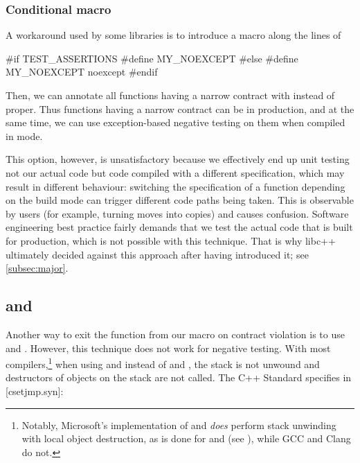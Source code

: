 \subsubsection{Conditional  macro}
\label{subsubsec:conditional}

A workaround used by some libraries is to introduce a macro along the lines of
\begin{codeblock}
#if TEST_ASSERTIONS
  #define MY_NOEXCEPT 
#else
  #define MY_NOEXCEPT noexcept
#endif
\end{codeblock}
Then, we can annotate all functions having a narrow contract with  instead of  proper. Thus functions having a narrow contract can be  in production, and at the same time, we can use exception-based negative testing on them when compiled in \mbox{} mode.

This option, however, is unsatisfactory because we effectively end up unit testing not our actual code but code compiled with a different specification, which may result in different behaviour: switching the  specification of a function depending on the build mode can trigger different code paths being taken. This is observable by users (for example, turning moves into copies) and causes confusion. Software engineering best practice fairly demands that we test the actual code that is built for production, which is not possible with this technique. That is why libc++ ultimately decided against this approach after having introduced it; see \ref{subsec:major}.

\subsection{ and }

Another way to exit the function from our  macro on contract violation is to use  and . However, this technique does not work for negative testing. With most compilers,\footnote{Notably, Microsoft's implementation of  and  \emph{does} perform stack unwinding with local object destruction, as is done for  and  (see \cite{MSVCDoofcLongjmp}), while GCC and Clang do not.} when using  and  instead of  and , the stack is not unwound and destructors of objects on the stack are not called. The C++ Standard specifies in [csetjmp.syn]:

